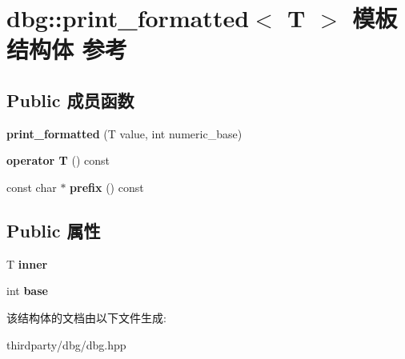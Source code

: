 \hypertarget{structdbg_1_1print__formatted}{}\section{dbg\+:\+:print\+\_\+formatted$<$ T $>$ 模板结构体 参考}
\label{structdbg_1_1print__formatted}
\subsection*{Public 成员函数}
\begin{DoxyCompactItemize}
\item 
\mbox{\label{structdbg_1_1print__formatted_a77fef2b6aa871171bfefe58bab8a03fe}} 
{\bfseries print\+\_\+formatted} (T value, int numeric\+\_\+base)
\item 
\mbox{\label{structdbg_1_1print__formatted_ab6a7c4280acb807f5c5ab812f80a8aca}} 
{\bfseries operator T} () const
\item 
\mbox{\label{structdbg_1_1print__formatted_ab490d37d984d053177b6af3f94d0136e}} 
const char $\ast$ {\bfseries prefix} () const
\end{DoxyCompactItemize}
\subsection*{Public 属性}
\begin{DoxyCompactItemize}
\item 
\mbox{\label{structdbg_1_1print__formatted_a080056e4f7af0c86ed46bc2ecb9c6f1e}} 
T {\bfseries inner}
\item 
\mbox{\label{structdbg_1_1print__formatted_af57ecb89743fca9b4cb1d0afd3c9d9f4}} 
int {\bfseries base}
\end{DoxyCompactItemize}


该结构体的文档由以下文件生成\+:\begin{DoxyCompactItemize}
\item 
thirdparty/dbg/dbg.\+hpp\end{DoxyCompactItemize}
